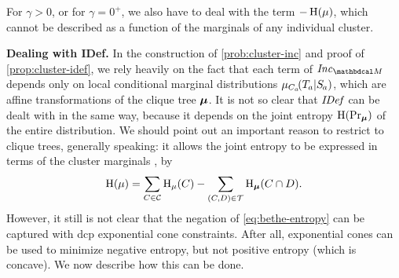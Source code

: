 \documentclass[twoside]{article}
\begin{document}
For $\gamma > 0$, or for $\gamma = 0^+$, we also have to deal with the term $-\operatorname{\mathrm{H}}(\mu)$, which cannot be described as a function of the marginals of any individual cluster. 

\textbf{Dealing with IDef.}
%
In the construction of \eqref{prob:cluster-inc}
and proof of \cref{prop:cluster-idef}, we rely
heavily on the fact that 
each term of $\Inc_{\dg M}$
depends only on local conditional marginal distributions $\mu_{C_a}\!(\Tgt a | \Src a)$,
which are affine transformations of the clique tree $\boldsymbol\mu$. 
It is not so clear that $\mathit{IDef}_{\!}$ can be dealt with in the same way, because it depends on the joint entropy $\operatorname{\mathrm{H}}(\Pr_{\boldsymbol\mu})$ of the entire distribution.
We should point out an important reason to restrict to clique trees, generally speaking: 
it allows the joint entropy to be expressed 
in terms of the cluster marginals \parencite{wainwright2008graphical}, 
by
\begin{equation}\label{eq:bethe-entropy}
    \operatorname{\mathrm{H}}(\mu) 
        = \sum_{C \in \mathcal C} \operatorname{\mathrm{H}}_\mu(C) 
        - \sum_{(C,D) \in \mathcal T} \operatorname{\mathrm{H}}_{\boldsymbol\mu}(C \cap D).
\end{equation}
However, 
it still is not clear that the negation of \eqref{eq:bethe-entropy} can be 
captured with dcp exponential cone constraints.
After all, exponential cones can be used to minimize negative entropy, but not positive entropy (which is concave). 
We now describe how this can be done.
\end{document}
